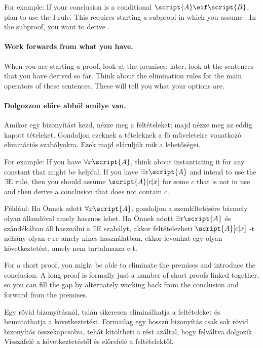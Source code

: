 For example: If your conclusion is a conditional $\script{A}\eif\script{B}$, plan to use the {\eif}I rule. This requires starting a subproof in which you assume . In the subproof, you want to derive .


\paragraph{Work forwards from what you have.}
When you are starting a proof, look at the premises; later, look at the sentences that you have derived so far. Think about the elimination rules for the main operators of these sentences. These will tell you what your options are.

\paragraph{Dolgozzon előre abból amilye van.}
Amikor egy bizonyítást kezd, nézze meg a feltételeket; majd nézze meg az eddig kapott tételeket. Gondoljon ezeknek a tételeknek a fő műveleteire vonatkozó eliminációs szabályokra. Ezek majd elárulják mik a lehetőségei.

For example: If you have $\forall x\script{A}$, think about instantiating it for any constant that might be helpful. If you have $\exists x\script{A}$ and intend to use the $\exists$E rule, then you should assume $\script{A}[c|x]$ for some $c$ that is not in use and then derive a conclusion that does not contain $c$.

Például: Ha Önnek adott $\forall x\script{A}$, gondoljon a szemléltetésére bármely olyan állandóval amely hasznos lehet. Ha Önnek adott $\exists x\script{A}$ és szándékában áll használni a $\exists$E szabályt, akkor feltételezheti $\script{A}[c|x]$ -t néhány olyan $c$-re amely nincs használatban, ekkor levonhat egy olyan következtetést, amely nem tartalmazza c-t.

For a short proof, you might be able to eliminate the premises and introduce the conclusion. A long proof is formally just a number of short proofs linked together, so you can fill the gap by alternately working back from the conclusion and forward from the premises.

Egy rövid bizonyításnál, talán sikeresen eliminálhatja a feltételeket és bemutathatja a következtetést. Formailag egy hosszú bizonyítás csak sok rövid bizonyítás összekapcsolva, tehát kitöltheti a rést azáltal, hogy felváltva dolgozik. Visszafelé a következtetéstől és előrefelé a feltételektől. 

